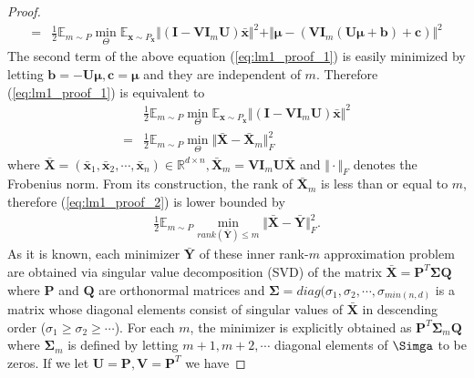 \documentclass{article}
\begin{document}
\begin{proof}
\begin{align}
        =& \frac{1}{2} \mathbb{E}_{m \sim P} \min_{\Theta}
        \mathbb{E}_{\mathbf{x} \sim P_\mathbf{x}} \Vert (\mathbf{I} - \mathbf{V} \mathbf{I}_m \mathbf{U}) \bar{\mathbf{x}} \Vert^2 + \Vert   \mathbf{\mu} - \left( \mathbf{V} \mathbf{I}_m \left( \mathbf{U} \mathbf{\mu} + \mathbf{b} \right) + \mathbf{c} \right) \Vert^2 \label{eq:lm1_proof_1}
    \end{align} 
    The second term of the above equation (\ref{eq:lm1_proof_1}) is easily minimized by letting
    $\mathbf{b} = -\mathbf{U}\mathbf{\mu}, \mathbf{c} = \mathbf{\mu}$ and they are independent of $m$. Therefore (\ref{eq:lm1_proof_1}) is equivalent to
    \begin{align}
        &\frac{1}{2} \mathbb{E}_{m \sim P} \min_{\Theta}
        \mathbb{E}_{\mathbf{x} \sim P_\mathbf{x}} \Vert (\mathbf{I} - \mathbf{V} \mathbf{I}_m \mathbf{U}) \bar{\mathbf{x}} \Vert^2 \nonumber \\
        =& \frac{1}{2} \mathbb{E}_{m \sim P} \min_{\Theta}
        \Vert \bar{\mathbf{X}} - \bar{\mathbf{X}}_m \Vert^2_F \label{eq:lm1_proof_2}
    \end{align}
    where $\bar{\mathbf{X}} = (\bar{\mathbf{x}}_1, \bar{\mathbf{x}}_2, \cdots, \bar{\mathbf{x}}_n) \in \mathbb{R}^{d \times n}, \bar{\mathbf{X}}_m = \mathbf{V} \mathbf{I}_m \mathbf{U} \bar{\mathbf{X}}$ and $\Vert \cdot \Vert_F$ denotes the Frobenius norm.
    From its construction, the rank of $\bar{\mathbf{X}}_m$ is less than or equal to $m$, therefore (\ref{eq:lm1_proof_2}) is lower bounded by
    \begin{align}
        \frac{1}{2} \mathbb{E}_{m \sim P} \min_{rank(\bar{\mathbf{Y}}) \leq m}
            \Vert \bar{\mathbf{X}} - \bar{\mathbf{Y}} \Vert^2_F. \label{eq:lm1_proof_3}
    \end{align}
    As it is known, each minimizer $\bar{\mathbf{Y}}$ of these inner rank-$m$ approximation problem are obtained via singular value decomposition (SVD) of the matrix $\bar{\mathbf{X}} = \mathbf{P}^T \mathbf{\Sigma} \mathbf{Q}$ where $\mathbf{P}$ and $\mathbf{Q}$ are orthonormal matrices and $\mathbf{\Sigma} = diag(\sigma_1, \sigma_2, \cdots, \sigma_{min(n, d)}$ is a matrix whose diagonal elements consist of singular values of $\bar{\mathbf{X}}$ in descending order ($\sigma_1 \geq \sigma_2 \geq \cdots$). For each $m$, the minimizer is explicitly obtained as $\mathbf{P}^T \mathbf{\Sigma}_m \mathbf{Q}$ where $\mathbf{\Sigma}_m$ is defined by letting $m+1, m+2, \cdots$ diagonal elements of $\mathbf{\Simga}$ to be zeros.
    If we let $\mathbf{U} = \mathbf{P}, \mathbf{V} = \mathbf{P}^T$ we have

\end{proof}
\end{document}
